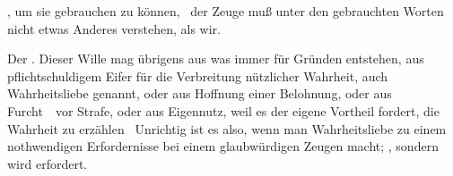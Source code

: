 \begin{aufza}
\begin{aufzb}
\item {}, um sie gebrauchen zu können, \dh\ der Zeuge muß unter den gebrauchten Worten nicht etwas Anderes verstehen, als wir.
\end{aufzb}
\item Der . Dieser Wille mag übrigens aus was immer für Gründen entstehen, aus pflichtschuldigem Eifer für die Verbreitung nützlicher Wahrheit, auch Wahrheitsliebe genannt, oder aus Hoffnung einer Belohnung, oder aus Furcht~\ vor Strafe, oder aus Eigennutz, weil es der eigene Vortheil fordert, die Wahrheit zu erzählen \usw\ Unrichtig ist es also, wenn man Wahrheitsliebe zu einem nothwendigen Erfordernisse bei einem glaubwürdigen Zeugen macht; , sondern  wird erfordert.
\end{aufza}\par

